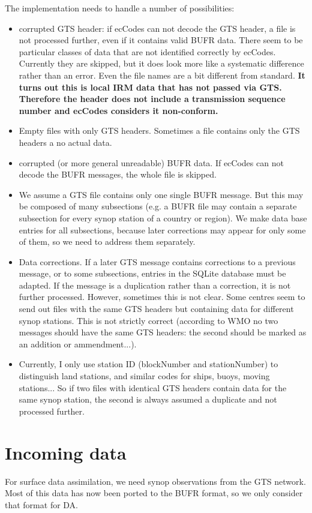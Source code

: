 \documentclass[10pt]{article}
\begin{document}
The implementation needs to handle a number of possibilities:
\begin{itemize}
\item corrupted GTS header: if ecCodes can not decode the GTS header, a file is not processed further, even if it contains valid BUFR data. There seem to be particular classes of data that are not identified correctly by ecCodes. Currently they are skipped, but it does look more like a systematic difference rather than an error. Even the file names are a bit different from standard. \textbf{It turns out this is local IRM data that has not passed via GTS. Therefore the header does not include a transmission sequence number and ecCodes considers it non-conform.}
\item Empty files with only GTS headers. Sometimes a file contains only the GTS headers a no actual data.
\item corrupted (or more general unreadable) BUFR data. If ecCodes can not decode the BUFR messages, the whole file is skipped.
\item We assume a GTS file contains only one single BUFR message. But this may be composed of many subsections (e.g. a BUFR file may contain a separate subsection for every synop station of a country or region). We make data base entries for all subsections, because later corrections may appear for only some of them, so we need to address them separately. 
\item Data corrections. If a later GTS message contains corrections to a previous message, or to some subsections, entries in the SQLite database must be adapted. If the message is a duplication rather than a correction, it is not further processed. However, sometimes this is not clear. Some centres seem to send out files with the same GTS headers but containing data for different synop stations. This is not strictly correct (according to WMO no two messages should have the same GTS headers: the second should be marked as an addition or ammendment...).
\item Currently, I only use station ID (blockNumber and stationNumber) to distinguish land stations, and similar codes for ships, buoys, moving stations... So if two files with identical GTS headers contain data for the same synop station, the second is always assumed a duplicate and not processed further.
\end{itemize}


\section{Incoming data}
For surface data assimilation, we need synop observations from the GTS network.
Most of this data has now been ported to the BUFR format, so we only consider that format for DA.
\end{document}
